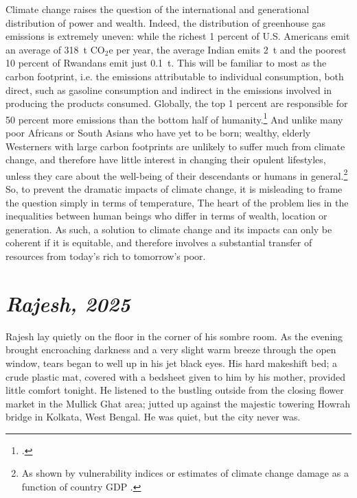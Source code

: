 \documentclass[a5paper,english,openany]{memoir}
\begin{document}
Climate change raises the question of the international and generational %
distribution of power and wealth. %
Indeed, the distribution of greenhouse gas emissions is extremely uneven: while the richest 1 percent of U.S. Americans emit an average of 318~t CO$_\text{2}$e per year, the average Indian emits 2~t and the poorest 10 percent of Rwandans emit just 0.1~t. %
This will be familiar to most as the carbon footprint, i.e. the emissions attributable to individual consumption, both direct, such as gasoline consumption and indirect in the emissions involved in producing the products consumed.
Globally, the top 1 percent are responsible for 50 percent more emissions than the bottom half of humanity.\footnote{\citet{bruckner_impacts_2022,chancel_carbon_2015}.} 
And unlike many poor Africans or South Asians who have yet to be born; %
wealthy, elderly Westerners with large carbon footprints are unlikely to suffer much from climate change, and therefore have little interest in changing their opulent lifestyles, unless they care about the well-being of their descendants or humans in general.\footnote{As shown by vulnerability indices \citep{chen_university_2015} or estimates of climate change damage as a function of country GDP \citep{burke_global_2015}.} 
So, to prevent the dramatic impacts of climate change, it is misleading to frame the question simply in terms of temperature, %
The heart %
of the problem lies in the inequalities between human beings who differ in terms of wealth, location or generation. As such, a solution to climate change and %
its impacts can only be coherent if it is equitable, and therefore involves a substantial transfer of resources from today's rich to tomorrow's poor. %
\chapter*{\textit{Rajesh, 2025}}\label{ch:narr_kolkata}Rajesh lay quietly on the floor in the corner of his sombre room. As the evening brought encroaching darkness and a very slight warm breeze through the open window, tears began to well up in his jet black eyes. His hard makeshift bed; a crude plastic mat, covered with a bedsheet given to him by his mother, provided little comfort tonight. He listened to the bustling outside from the closing flower market in the Mullick Ghat area; jutted up against the majestic towering Howrah bridge in Kolkata, West Bengal. He was quiet, but the city never was.
\end{document}
